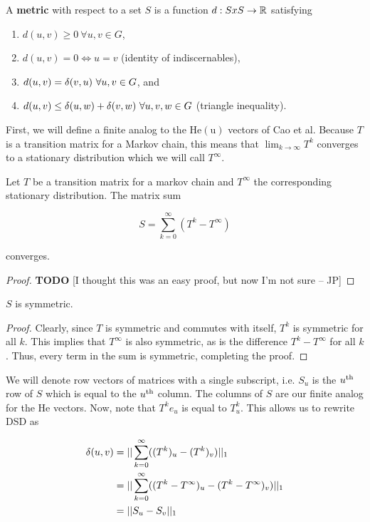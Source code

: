 \begin{definition}
  A \textbf{metric} with respect to a set $S$ is a function $d : S x S \to \mathbb{R}$
  satisfying

  \begin{enumerate}
  \item $d(u,v)\geq 0 ~ \forall u,v \in G$,
  \item $d(u,v) = 0 \iff u = v$ (identity of indiscernables),
  \item $d(u,v) = \delta(v,u) ~\forall u,v \in G$, and
  \item $d(u,v) \leq \delta(u,w) + \delta(v,w) ~\forall u,v,w \in G$
    (triangle inequality).
  \end{enumerate}\end{definition}

First, we will define a finite analog to the $\mathrm{He(u)}$ vectors of Cao et al. Because
$T$ is a transition matrix for a Markov chain, this means that
$\lim_{k \to \infty} T^k$ converges to a stationary distribution which we will
call $T^\infty$.

\begin{lemma}
  Let $T$ be a transition matrix for a markov chain and $T^\infty$ the
  corresponding stationary distribution. The matrix sum

  \[
    S = \sum_{k=0}^{\infty}(T^k - T^\infty)
  \]

  converges.
\end{lemma}
\begin{proof}
  \textbf{TODO} [I thought this was an easy proof, but now I'm not sure -- JP]
\end{proof}

\begin{remark}
  $S$ is symmetric.
\end{remark}
\begin{proof}
  Clearly, since $T$ is symmetric and commutes with itself, $T^k$ is symmetric
  for all $k$. This implies that $T^\infty$ is also symmetric, as is the
  difference $T^k - T^\infty$ for all $k$. Thus, every term in the sum is
  symmetric, completing the proof.
\end{proof}

We will denote row vectors of matrices with a single subscript, i.e. $S_u$ is
the $u^{\mathrm{th}}$ row of $S$ which is equal to the $u^{\mathrm{th}}$ column. The columns of $S$
are our finite analog for the $\mathrm{He}$ vectors. Now, note that $T^ke_u$ is
equal to $T^k_u$. This allows us to rewrite DSD as

\begin{align*}
  \delta(u,v) &= ||\sum_{k=0}^{\infty}((T^k)_u - (T^k)_v)||_1 \\
              &= ||\sum_{k=0}^{\infty}((T^k-T^\infty)_u - (T^k-T^\infty)_v)||_1 \\
              &= ||S_u - S_v||_1
\end{align*}

